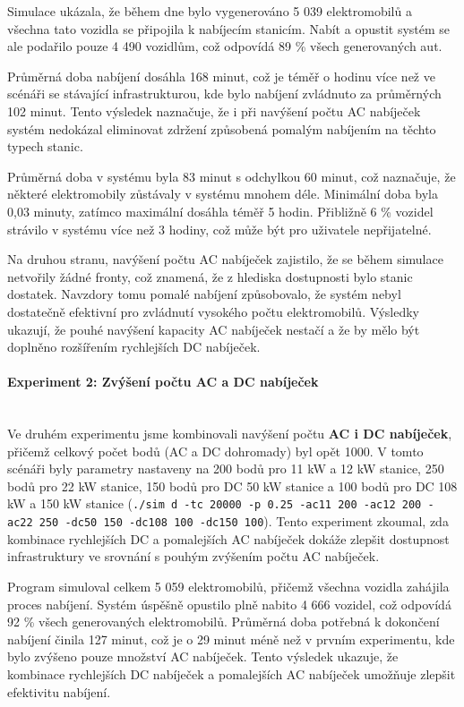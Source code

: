 \documentclass[a4paper,11pt]{article}
\begin{document}
Simulace ukázala, že během dne bylo vygenerováno 5 039 elektromobilů a všechna tato vozidla se připojila k nabíjecím stanicím. Nabít a opustit systém se ale podařilo pouze 4 490 vozidlům, což odpovídá 89 \% všech generovaných aut.

Průměrná doba nabíjení dosáhla 168 minut, což je téměř o hodinu více než ve scénáři se stávající infrastrukturou, kde bylo nabíjení zvládnuto za průměrných 102 minut. Tento výsledek naznačuje, že i při navýšení počtu AC nabíječek systém nedokázal eliminovat zdržení způsobená pomalým nabíjením na těchto typech stanic.

Průměrná doba v systému byla 83 minut s odchylkou 60 minut, což naznačuje, že některé elektromobily zůstávaly v systému mnohem déle. Minimální doba byla 0,03 minuty, zatímco maximální dosáhla téměř 5 hodin. Přibližně 6 \% vozidel strávilo v systému více než 3 hodiny, což může být pro uživatele nepřijatelné.

Na druhou stranu, navýšení počtu AC nabíječek zajistilo, že se během simulace netvořily žádné fronty, což znamená, že z hlediska dostupnosti bylo stanic dostatek. Navzdory tomu pomalé nabíjení způsobovalo, že systém nebyl dostatečně efektivní pro zvládnutí vysokého počtu elektromobilů. Výsledky ukazují, že pouhé navýšení kapacity AC nabíječek nestačí a že by mělo být doplněno rozšířením rychlejších DC nabíječek.


\paragraph{Experiment 2: Zvýšení počtu AC a DC nabíječek\\\\}
Ve druhém experimentu jsme kombinovali navýšení počtu \textbf{AC i DC nabíječek}, přičemž celkový počet bodů (AC a DC dohromady) byl opět 1000. V tomto scénáři byly parametry nastaveny na 200 bodů pro 11 kW a 12 kW stanice, 250 bodů pro 22 kW stanice, 150 bodů pro DC 50 kW stanice a 100 bodů pro DC 108 kW a 150 kW stanice (\texttt{./sim d -tc 20000 -p 0.25 -ac11 200 -ac12 200 -ac22 250 -dc50 150 -dc108 100 -dc150 100}). Tento experiment zkoumal, zda kombinace rychlejších DC a pomalejších AC nabíječek dokáže zlepšit dostupnost infrastruktury ve srovnání s pouhým zvýšením počtu AC nabíječek.

Program simuloval celkem 5 059 elektromobilů, přičemž všechna vozidla zahájila proces nabíjení. Systém úspěšně opustilo plně nabito 4 666 vozidel, což odpovídá 92 \% všech generovaných elektromobilů. Průměrná doba potřebná k dokončení nabíjení činila 127 minut, což je o 29 minut méně než v prvním experimentu, kde bylo zvýšeno pouze množství AC nabíječek. Tento výsledek ukazuje, že kombinace rychlejších DC nabíječek a pomalejších AC nabíječek umožňuje zlepšit efektivitu nabíjení.
\end{document}
